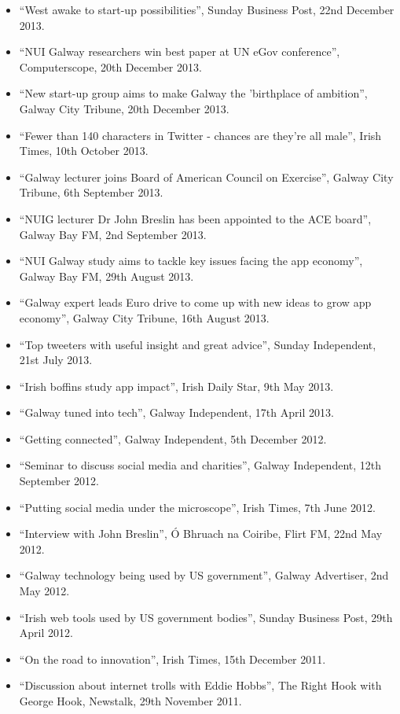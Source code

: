\documentclass[10pt,a4paper]{res} %
\begin{document}
\begin{resume}
{\begin{itemize}
\item ``West awake to start-up possibilities'', Sunday Business Post, 22nd December 2013.
\item ``NUI Galway researchers win best paper at UN eGov conference'', Computerscope, 20th December 2013.
\item ``New start-up group aims to make Galway the 'birthplace of ambition'', Galway City Tribune, 20th December 2013.
\item ``Fewer than 140 characters in Twitter - chances are they're all male'', Irish Times, 10th October 2013.
\item ``Galway lecturer joins Board of American Council on Exercise'', Galway City Tribune, 6th September 2013.
\item ``NUIG lecturer Dr John Breslin has been appointed to the ACE board'', Galway Bay FM, 2nd September 2013.
\item ``NUI Galway study aims to tackle key issues facing the app economy'', Galway Bay FM, 29th August 2013.
\item ``Galway expert leads Euro drive to come up with new ideas to grow app economy'', Galway City Tribune, 16th August 2013.
\item ``Top tweeters with useful insight and great advice'', Sunday Independent, 21st July 2013.
\item ``Irish boffins study app impact'', Irish Daily Star, 9th May 2013.
\item ``Galway tuned into tech'', Galway Independent, 17th April 2013.
\item ``Getting connected'', Galway Independent, 5th December 2012.
\item ``Seminar to discuss social media and charities'', Galway Independent, 12th September 2012.
\item ``Putting social media under the microscope'', Irish Times, 7th June 2012.
\item ``Interview with John Breslin'', \'{O} Bhruach na Coiribe, Flirt FM, 22nd May 2012.
\item ``Galway technology being used by US government'', Galway Advertiser, 2nd May 2012.
\item ``Irish web tools used by US government bodies'', Sunday Business Post, 29th April 2012.
\item ``On the road to innovation'', Irish Times, 15th December 2011.
\item ``Discussion about internet trolls with Eddie Hobbs'', The Right Hook with George Hook, Newstalk, 29th November 2011.

\end{itemize}}
\end{resume}
\end{document}
